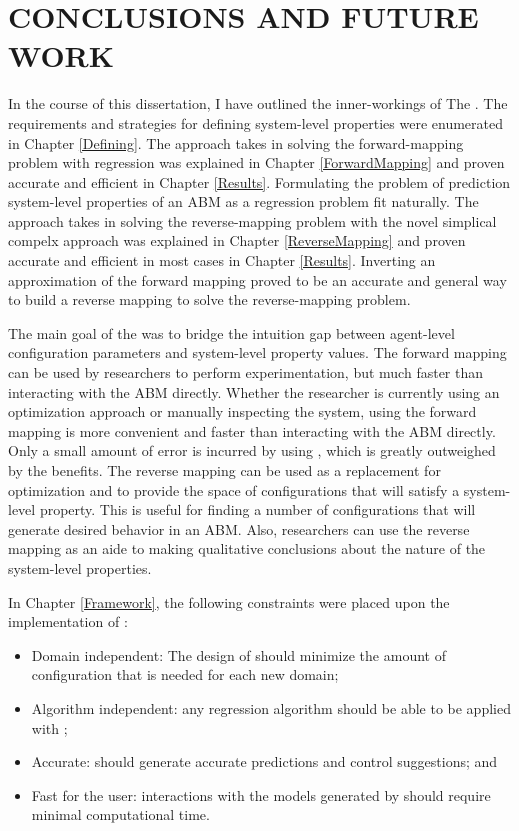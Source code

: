 \chapter{CONCLUSIONS AND FUTURE WORK}
\thispagestyle{plain}

\label{Conclusions}

In the course of this dissertation, I have outlined the inner-workings of The \framework.
The requirements and strategies for defining system-level properties were enumerated in Chapter \ref{Defining}.
The approach \fw takes in solving the forward-mapping problem with regression was explained in Chapter \ref{ForwardMapping} and proven accurate and efficient in Chapter \ref{Results}.
Formulating the problem of prediction  system-level properties of an ABM as a regression problem fit naturally.
The approach \fw takes in solving the reverse-mapping problem with the novel simplical compelx approach was explained in Chapter \ref{ReverseMapping} and proven accurate and efficient in most cases in Chapter \ref{Results}.
Inverting an approximation of the forward mapping proved to be an accurate and general way to build a reverse mapping to solve the reverse-mapping problem.

The main goal of the \framework was to bridge the intuition gap between agent-level configuration parameters and system-level property values.
The forward mapping can be used by researchers to perform experimentation, but much faster than interacting with the ABM directly.
Whether the researcher is currently using an optimization approach or manually inspecting the system, using the forward mapping is  more convenient and faster than interacting with the ABM directly.
Only a small amount of error is incurred by using \fw, which is greatly outweighed by the benefits.
The reverse mapping can be used as a replacement for optimization and to provide the space of configurations that will satisfy a system-level property.
This is useful for finding a number of configurations that will generate desired behavior in an ABM.
Also, researchers can use the reverse mapping as an aide to making qualitative conclusions about the nature of the system-level properties.

In Chapter \ref{Framework}, the following constraints were placed upon the implementation of \fw:
\begin{itemize}
      \item Domain independent: The design of \fw should minimize the amount of configuration that is needed for each new domain;
      \item Algorithm independent: any regression algorithm should be able to be applied with \fw;
      \item Accurate: \fw should generate accurate predictions and control suggestions; and
      \item Fast for the user: interactions with the models generated by \fw should require minimal computational time.
\end{itemize}

